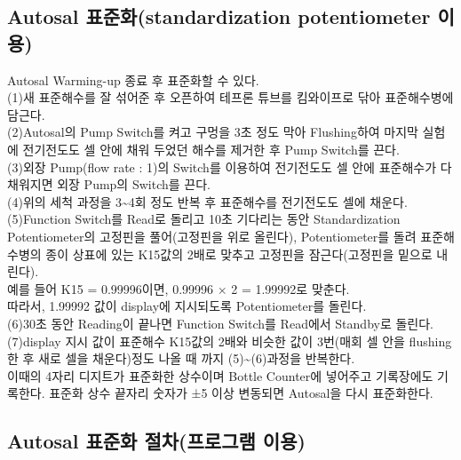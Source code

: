 \documentclass[
]{book}
\begin{document}
\hypertarget{autosal-uxd45cuxc900uxd654standardization-potentiometer-uxc774uxc6a9}{%
\subsection{Autosal 표준화(standardization potentiometer 이용)}\label{autosal-uxd45cuxc900uxd654standardization-potentiometer-uxc774uxc6a9}}

Autosal Warming-up 종료 후 표준화할 수 있다.\\
(1)새 표준해수를 잘 섞어준 후 오픈하여 테프론 튜브를 킴와이프로 닦아 표준해수병에 담근다.\\
(2)Autosal의 Pump Switch를 켜고 구멍을 3초 정도 막아 Flushing하여 마지막 실험에 전기전도도 셀 안에 채워 두었던 해수를 제거한 후 Pump Switch를 끈다.\\
(3)외장 Pump(flow rate : 1)의 Switch를 이용하여 전기전도도 셀 안에 표준해수가 다 채워지면 외장 Pump의 Switch를 끈다.\\
(4)위의 세척 과정을 3\textasciitilde4회 정도 반복 후 표준해수를 전기전도도 셀에 채운다.\\
(5)Function Switch를 Read로 돌리고 10초 기다리는 동안 Standardization Potentiometer의 고정핀을 풀어(고정핀을 위로 올린다), Potentiometer를 돌려 표준해수병의 종이 상표에 있는 K15값의 2배로 맞추고 고정핀을 잠근다(고정핀을 밑으로 내린다).\\
예를 들어 K15 = 0.99996이면, 0.99996 × 2 = 1.99992로 맞춘다.\\
따라서, 1.99992 값이 display에 지시되도록 Potentiometer를 돌린다.\\
(6)30초 동안 Reading이 끝나면 Function Switch를 Read에서 Standby로 돌린다.\\
(7)display 지시 값이 표준해수 K15값의 2배와 비슷한 값이 3번(매회 셀 안을 flushing한 후 새로 셀을 채운다)정도 나올 때 까지 (5)\textasciitilde(6)과정을 반복한다.\\
이때의 4자리 디지트가 표준화한 상수이며 Bottle Counter에 넣어주고 기록장에도 기록한다. 표준화 상수 끝자리 숫자가 ±5 이상 변동되면 Autosal을 다시 표준화한다.

\hypertarget{autosal-uxd45cuxc900uxd654-uxc808uxcc28uxd504uxb85cuxadf8uxb7a8-uxc774uxc6a9}{%
\subsection{Autosal 표준화 절차(프로그램 이용)}\label{autosal-uxd45cuxc900uxd654-uxc808uxcc28uxd504uxb85cuxadf8uxb7a8-uxc774uxc6a9}}
\end{document}
